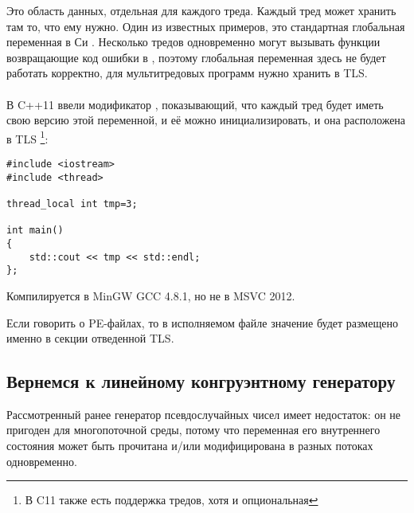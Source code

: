 \label{TLS}

Это область данных, отдельная для каждого треда. Каждый тред может хранить там то, что ему нужно.
Один из известных примеров, это стандартная глобальная переменная в Си . 
Несколько тредов одновременно могут вызывать функции возвращающие код ошибки в , поэтому глобальная переменная здесь не будет работать корректно, 
для мультитредовых программ  нужно хранить в \ac{TLS}. \\
\\
В C++11 ввели модификатор , показывающий, что каждый тред будет иметь свою версию этой переменной, и её можно инициализировать, и она расположена в \ac{TLS}
\footnote{ В C11 также есть поддержка тредов, хотя и опциональная}:

\begin{lstlisting}[caption=C++11,style=customc]
#include <iostream>
#include <thread>

thread_local int tmp=3;

int main()
{
	std::cout << tmp << std::endl;
};
\end{lstlisting}

Компилируется в MinGW GCC 4.8.1, но не в MSVC 2012.

Если говорить о PE-файлах, то в исполняемом файле значение  будет размещено именно в секции отведенной \ac{TLS}.

\subsection{Вернемся к линейному конгруэнтному генератору}
\label{LCG_TLS}

Рассмотренный ранее  генератор псевдослучайных чисел имеет недостаток:
он не пригоден для многопоточной среды, потому что переменная его внутреннего состояния может быть
прочитана и/или модифицирована в разных потоках одновременно.





